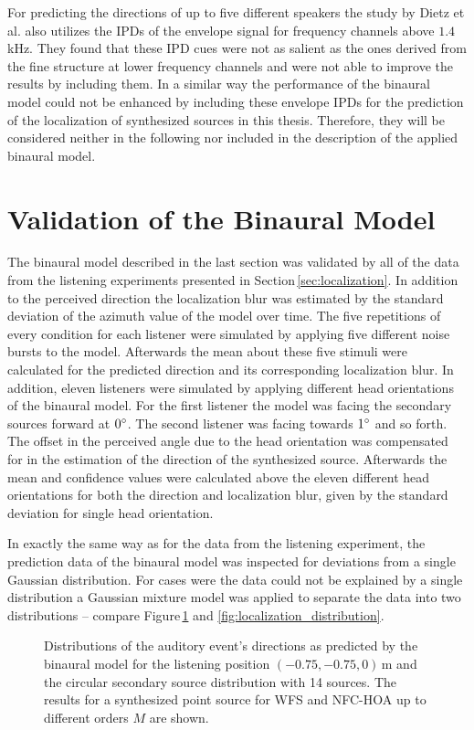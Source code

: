For predicting the directions of up to five different speakers the study by
Dietz et al.\autocite{Dietz2011} also utilizes the \acp{IPD} of the envelope
signal for frequency channels above $1.4$\,kHz. They found that these \ac{IPD}
cues were not as salient as the ones derived from the fine structure at lower
frequency channels and were not able to improve the results by including them.
In a similar way the performance of the binaural model could not be enhanced by
including these envelope \acp{IPD} for the prediction of the localization of
synthesized sources in this thesis. Therefore, they will be considered neither in the
following nor included in the description of the applied
binaural model.


\section{Validation of the Binaural Model}
\label{sec:validation_of_the_binaural_model}
%
The binaural model described in the last section was validated by all of the
data from the listening experiments presented in Section\,\ref{sec:localization}.
In addition to the perceived direction the localization blur was estimated by
the standard deviation of the azimuth value of the model over time.
The five repetitions of every condition for each listener were simulated by
applying five different noise bursts to the model. Afterwards the mean about
these five stimuli were calculated for the predicted direction and its
corresponding localization blur.
In addition, eleven listeners were simulated by applying different head
orientations of the binaural model. For the first listener the model was facing
the secondary sources forward at $0^\circ$. The second listener was facing
towards $1^\circ$ and so forth. The offset in the perceived angle due to the
head orientation was compensated for in the estimation of the direction of the
synthesized source. Afterwards the mean and confidence values were calculated
above the eleven different head orientations for both the direction and
localization blur, given by the standard deviation for single head orientation.

In exactly the same way as for the data from the listening experiment, the
prediction data of the binaural model was inspected for deviations from a
single Gaussian distribution. For cases were the data could not be explained by
a single distribution a Gaussian mixture model was applied to separate the data
into two distributions -- compare
Figure\,\ref{fig:model_localization_distribution} and
\ref{fig:localization_distribution}.
%
\begin{figure}
    \small
    
    \caption{Distributions of the auditory event's directions as predicted
    by the binaural model for the listening position $(-0.75,-0.75,0)$\,m and the
    circular secondary source distribution with 14 sources.
    The results for a synthesized point source for \ac{WFS} and
    \ac{NFC-HOA} up to different orders $M$ are shown.
    }
    \label{fig:model_localization_distribution}
\end{figure}


